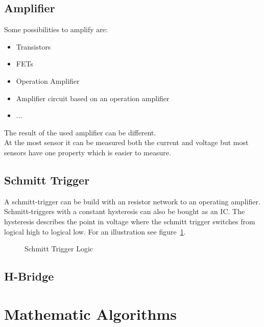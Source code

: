 \subsection{Amplifier}\label{sec:Amplifier}
Some possibilities to amplify are:
\begin{itemize}
\item Transistors
\item FETs
\item Operation Amplifier
\item Amplifier circuit based on an operation amplifier
\item ...
\end{itemize}
The result of the used amplifier can be different.\\
At the most sensor it can be measured both the current and voltage but most sensors have one property which is easier to measure.


\subsection{Schmitt Trigger}\label{sec:schmittTrigger}
A schmitt-trigger can be build with an resistor network to an operating amplifier.
Schmitt-triggers with a constant hysteresis can also be bought as an IC.
The hysteresis describes the point in voltage where the schmitt trigger switches from logical high to logical low.
For an illustration see figure~\ref{fig:schmittTrigger}.


\begin{figure}
\caption{Schmitt Trigger Logic}
\label{fig:schmittTrigger}
\end{figure}



\subsection{H-Bridge}\label{sec:hBridge}


\section{Mathematic Algorithms}\label{sec:mathematicAlgorithms}


